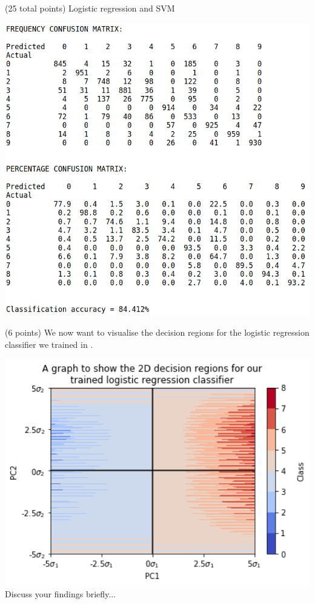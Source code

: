 \documentclass[12pt]{article}
\begin{document}
\begin{question}{(25 total points) Logistic regression and SVM}
\begin{subquestion}
   

      \begin{answerbox}{37em}
         \includegraphics[width=1\textwidth]{images/q22.png}
      \end{answerbox}
  


   \end{subquestion}
   \begin{subquestion}{(6 points)
       We now want to visualise the decision regions for the logistic
       regression classifier we trained in .
     } \label{Q2.3}


   

      \begin{answerbox}{35em}
         \includegraphics[width=1\textwidth]{images/q23.png}
        Discuss your findings briefly...
      \end{answerbox}
  



\end{subquestion}
\end{question}
\end{document}
